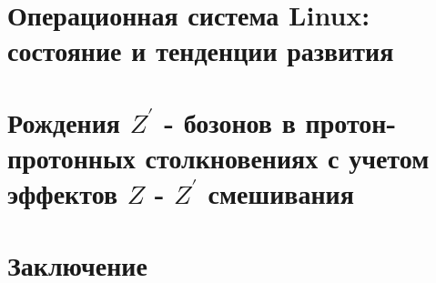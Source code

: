 \documentclass[12pt,a4paper]{styles/report}
\begin{document}
	
\renewcommand\contentsname{СОДЕРЖАНИЕ}
\renewcommand{\bibname}{СПИСОК ИСПОЛЬЗОВАННЫХ ИСТОЧНИКОВ}
\renewcommand\chaptername{ГЛАВА}
\renewcommand\figurename{Рисунок}
\renewcommand\tablename{Таблица}



\newpage
\pagestyle{plain}  \setcounter{page}{2}
\large \tableofcontents

%

\chapter{Операционная система Linux: состояние и тенденции развития}






\chapter{Рождения $Z^\prime$ - бозонов в протон-протонных столкновениях с учетом эффектов $Z$ - $Z^\prime$ смешивания}




\chapter{Заключение}


\newpage
\begin{thebibliography}{9999.}



\end{thebibliography}
\end{document}
